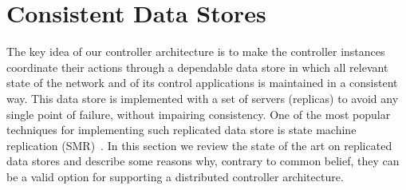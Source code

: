 



\section{Consistent Data Stores}
\glsresetall
\label{sec:relatedWork:consistentDataStore}
The key idea of our controller architecture is to make the controller instances coordinate their actions through a dependable data store in which all relevant state of the network and of its control applications is maintained in a consistent way.
This data store is implemented with a set of servers (replicas) to avoid any single point of failure, without impairing consistency.
One of the most popular techniques for implementing such replicated data store is state machine replication (SMR)~\cite{Sch90,Lam98}.
In this section we review the state of the art on replicated data stores and describe some reasons why, contrary to common belief, they can be a valid option for supporting a distributed controller architecture.

